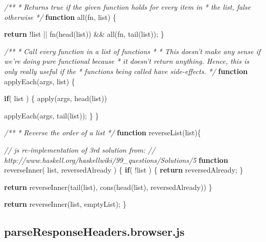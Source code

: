 \documentclass[12pt, ]{article}
\newenvironment{Shaded}{}{}
\newcommand{\KeywordTok}[1]{\textcolor[rgb]{0.00,0.44,0.13}{\textbf{{#1}}}}
\newcommand{\CommentTok}[1]{\textcolor[rgb]{0.38,0.63,0.69}{\textit{{#1}}}}
\newcommand{\FunctionTok}[1]{\textcolor[rgb]{0.02,0.16,0.49}{{#1}}}
\newcommand{\NormalTok}[1]{{#1}}
\begin{document}
\begin{Shaded}
\begin{Highlighting}[]
\CommentTok{/** }
\CommentTok{ * Returns true if the given function holds for every item in }
\CommentTok{ * the list, false otherwise }
\CommentTok{ */}
\KeywordTok{function} \FunctionTok{all}\NormalTok{(fn, list) \{}
   
   \KeywordTok{return} \NormalTok{!list || }
          \FunctionTok{fn}\NormalTok{(}\FunctionTok{head}\NormalTok{(list)) && }\FunctionTok{all}\NormalTok{(fn, }\FunctionTok{tail}\NormalTok{(list));}
\NormalTok{\}}

\CommentTok{/**}
\CommentTok{ * Call every function in a list of functions}
\CommentTok{ * }
\CommentTok{ * This doesn't make any sense if we're doing pure functional because }
\CommentTok{ * it doesn't return anything. Hence, this is only really useful if the}
\CommentTok{ * functions being called have side-effects. }
\CommentTok{ */}
\KeywordTok{function} \FunctionTok{applyEach}\NormalTok{(args, list) \{}

   \KeywordTok{if}\NormalTok{( list ) \{  }
      \FunctionTok{apply}\NormalTok{(args, }\FunctionTok{head}\NormalTok{(list))}
      
      \FunctionTok{applyEach}\NormalTok{(args, }\FunctionTok{tail}\NormalTok{(list));}
   \NormalTok{\}}
\NormalTok{\}}

\CommentTok{/**}
\CommentTok{ * Reverse the order of a list}
\CommentTok{ */}
\KeywordTok{function} \FunctionTok{reverseList}\NormalTok{(list)\{ }

   \CommentTok{// js re-implementation of 3rd solution from:}
   \CommentTok{//    http://www.haskell.org/haskellwiki/99_questions/Solutions/5}
   \KeywordTok{function} \FunctionTok{reverseInner}\NormalTok{( list, reversedAlready ) \{}
      \KeywordTok{if}\NormalTok{( !list ) \{}
         \KeywordTok{return} \NormalTok{reversedAlready;}
      \NormalTok{\}}
      
      \KeywordTok{return} \FunctionTok{reverseInner}\NormalTok{(}\FunctionTok{tail}\NormalTok{(list), }\FunctionTok{cons}\NormalTok{(}\FunctionTok{head}\NormalTok{(list), reversedAlready))}
   \NormalTok{\}}

   \KeywordTok{return} \FunctionTok{reverseInner}\NormalTok{(list, emptyList);}
\NormalTok{\}}
\end{Highlighting}
\end{Shaded}

\pagebreak

\subsection{parseResponseHeaders.browser.js}\label{headerux5fparseResponseHeaders.browser}
\end{document}

